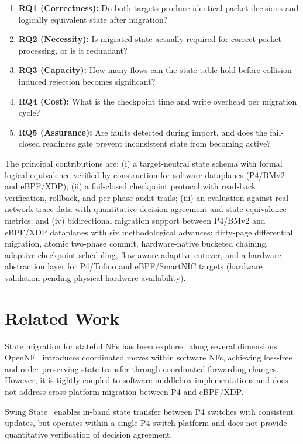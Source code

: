 \documentclass[10pt, conference]{IEEEtran}
\begin{document}
\begin{enumerate}
    \item \textbf{RQ1 (Correctness):} Do both targets produce identical packet decisions and logically equivalent state after migration?
    \item \textbf{RQ2 (Necessity):} Is migrated state actually required for correct packet processing, or is it redundant?
    \item \textbf{RQ3 (Capacity):} How many flows can the state table hold before collision-induced rejection becomes significant?
    \item \textbf{RQ4 (Cost):} What is the checkpoint time and write overhead per migration cycle?
    \item \textbf{RQ5 (Assurance):} Are faults detected during import, and does the fail-closed readiness gate prevent inconsistent state from becoming active?
\end{enumerate}

The principal contributions are: (i) a target-neutral state schema with formal logical equivalence verified by construction for software dataplanes (P4/BMv2 and eBPF/XDP); (ii) a fail-closed checkpoint protocol with read-back verification, rollback, and per-phase audit trails; (iii) an evaluation against real network trace data with quantitative decision-agreement and state-equivalence metrics; and (iv) bidirectional migration support between P4/BMv2 and eBPF/XDP dataplanes with six methodological advances: dirty-page differential migration, atomic two-phase commit, hardware-native bucketed chaining, adaptive checkpoint scheduling, flow-aware adaptive cutover, and a hardware abstraction layer for P4/Tofino and eBPF/SmartNIC targets (hardware validation pending physical hardware availability).

\section{Related Work}
\label{sec:related_work}

State migration for stateful NFs has been explored along several dimensions. OpenNF~\cite{gember2014opennf} introduces coordinated moves within software NFs, achieving loss-free and order-preserving state transfer through coordinated forwarding changes. However, it is tightly coupled to software middlebox implementations and does not address cross-platform migration between P4 and eBPF/XDP.

Swing State~\cite{luo2017swing} enables in-band state transfer between P4 switches with consistent updates, but operates within a single P4 switch platform and does not provide quantitative verification of decision agreement.
\end{document}
